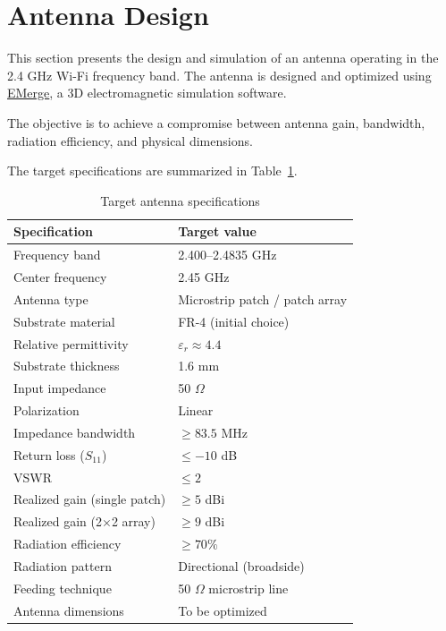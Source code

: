 
\section{Antenna Design}

This section presents the design and simulation of an antenna
operating in the 2.4 GHz Wi-Fi frequency band. The antenna
is designed and optimized using \href{https://www.emerge-software.com}
{EMerge}, a 3D electromagnetic simulation software.

The objective is to achieve a compromise between antenna gain,
bandwidth, radiation efficiency, and physical dimensions.

The target specifications are summarized in
Table~\ref{tab:antenna-specifications}.

\begin{table}[htbp]
    \centering
    \caption{Target antenna specifications}
    \label{tab:antenna-specifications}
    \begin{tabular}{|l|l|}
        \hline
        \textbf{Specification} & \textbf{Target value} \\
        \hline
        Frequency band & 2.400--2.4835 GHz \\
        \hline
        Center frequency & 2.45 GHz \\
        \hline
        Antenna type & Microstrip patch / patch array \\
        \hline
        Substrate material & FR-4 (initial choice) \\
        \hline
        Relative permittivity & $\varepsilon_r \approx 4.4$ \\
        \hline
        Substrate thickness & 1.6 mm \\
        \hline
        Input impedance & 50 $\Omega$ \\
        \hline
        Polarization & Linear \\
        \hline
        Impedance bandwidth & $\geq 83.5$ MHz \\
        \hline
        Return loss ($S_{11}$) & $\leq -10$ dB \\
        \hline
        VSWR & $\leq 2$ \\
        \hline
        Realized gain (single patch) & $\geq 5$ dBi \\
        \hline
        Realized gain (2$\times$2 array) & $\geq 9$ dBi \\
        \hline
        Radiation efficiency & $\geq 70\%$ \\
        \hline
        Radiation pattern & Directional (broadside) \\
        \hline
        Feeding technique & 50 $\Omega$ microstrip line \\
        \hline
        Antenna dimensions & To be optimized \\
        \hline
    \end{tabular}
\end{table}
